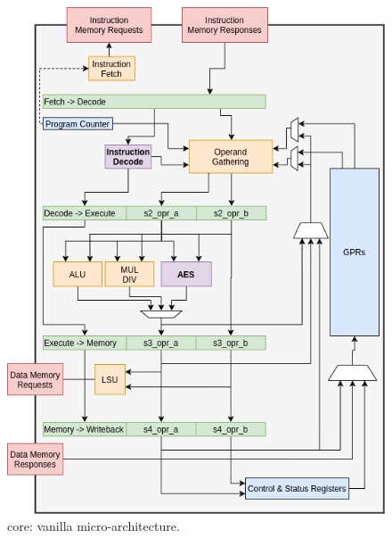 
\begin{figure}[!h]
\centering
\includegraphics[scale={0.45},angle={90}]{diagrams/scarv-cpu-uarch.png}
\caption{
   core: vanilla  micro-architecture.
}
\label{fig:core:2:normal}
\end{figure}


